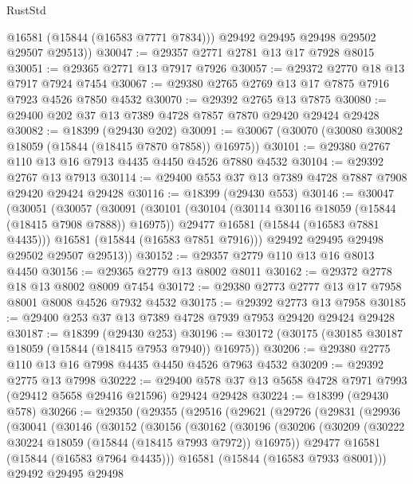 \begin{lexlean}{RustStd}
\begin{coremodule}
          @16581
          (@15844 (@16583 @7771 @7834)))
        @29492
        @29495
        @29498
        @29502
        @29507
        @29513))
@30047 := @29357 @2771 @2781 @13 @17 @7928 @8015
@30051 := @29365 @2771 @13 @7917 @7926
@30057 := @29372 @2770 @18 @13 @7917 @7924 @7454
@30067 := @29380 @2765 @2769 @13 @17 @7875 @7916 @7923 @4526 @7850 @4532
@30070 := @29392 @2765 @13 @7875
@30080 := @29400 @202 @37 @13 @7389 @4728 @7857 @7870 @29420 @29424 @29428
@30082 := @18399 (@29430 @202)
@30091 := @30067 (@30070 (@30080 @30082 @18059 (@15844 (@18415 @7870 @7858)) @16975))
@30101 := @29380 @2767 @110 @13 @16 @7913 @4435 @4450 @4526 @7880 @4532
@30104 := @29392 @2767 @13 @7913
@30114 := @29400 @553 @37 @13 @7389 @4728 @7887 @7908 @29420 @29424 @29428
@30116 := @18399 (@29430 @553)
@30146 := @30047
    (@30051
      (@30057
        (@30091
          (@30101
            (@30104 (@30114 @30116 @18059 (@15844 (@18415 @7908 @7888)) @16975))
            @29477
            @16581
            (@15844 (@16583 @7881 @4435)))
          @16581
          (@15844 (@16583 @7851 @7916)))
        @29492
        @29495
        @29498
        @29502
        @29507
        @29513))
@30152 := @29357 @2779 @110 @13 @16 @8013 @4450
@30156 := @29365 @2779 @13 @8002 @8011
@30162 := @29372 @2778 @18 @13 @8002 @8009 @7454
@30172 := @29380 @2773 @2777 @13 @17 @7958 @8001 @8008 @4526 @7932 @4532
@30175 := @29392 @2773 @13 @7958
@30185 := @29400 @253 @37 @13 @7389 @4728 @7939 @7953 @29420 @29424 @29428
@30187 := @18399 (@29430 @253)
@30196 := @30172 (@30175 (@30185 @30187 @18059 (@15844 (@18415 @7953 @7940)) @16975))
@30206 := @29380 @2775 @110 @13 @16 @7998 @4435 @4450 @4526 @7963 @4532
@30209 := @29392 @2775 @13 @7998
@30222 := @29400 @578 @37 @13 @5658 @4728 @7971 @7993 (@29412 @5658 @29416 @21596) @29424 @29428
@30224 := @18399 (@29430 @578)
@30266 := @29350
    (@29355
      (@29516
        (@29621
          (@29726
            (@29831
              (@29936
                (@30041
                  (@30146
                    (@30152
                      (@30156
                        (@30162
                          (@30196
                            (@30206
                              (@30209 (@30222 @30224 @18059 (@15844 (@18415 @7993 @7972)) @16975))
                              @29477
                              @16581
                              (@15844 (@16583 @7964 @4435)))
                            @16581
                            (@15844 (@16583 @7933 @8001)))
                          @29492
                          @29495
                          @29498

\end{coremodule}
\end{lexlean}
